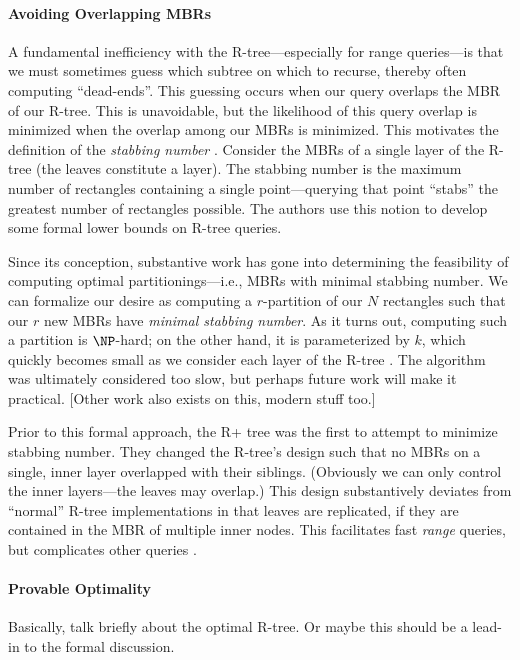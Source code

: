 \paragraph{Avoiding Overlapping MBRs}
A fundamental inefficiency with the R-tree---especially for range queries---is that we must sometimes guess which subtree on which to recurse, thereby often computing ``dead-ends''.
This guessing occurs when our query overlaps the MBR of our R-tree.
This is unavoidable, but the likelihood of this query overlap is minimized when the overlap among our MBRs is minimized.
This motivates the definition of the \emph{stabbing number} \cite{berggudmundssonhammarovermars00}.
Consider the MBRs of a single layer of the R-tree (the leaves constitute a layer).
The stabbing number is the maximum number of rectangles containing a single point---querying that point ``stabs'' the greatest number of rectangles possible.
The authors \cite{berggudmundssonhammarovermars00} use this notion to develop some formal lower bounds on R-tree queries.

Since its conception, substantive work has gone into determining the feasibility of computing optimal partitionings---i.e., MBRs with minimal stabbing number.
We can formalize our desire as computing a $r$-partition of our $N$ rectangles such that our $r$ new MBRs have \emph{minimal stabbing number}.
As it turns out, computing such a partition is $\NP$-hard; on the other hand, it is parameterized by $k$, which quickly becomes small as we consider each layer of the R-tree \cite{bergkhosraviverdonschotweele11}.
The algorithm was ultimately considered too slow, but perhaps future work will make it practical.
[Other work also exists on this, modern stuff too.]

Prior to this formal approach, the R+ tree \cite{sellisroussopoulosfaloutsos87} was the first to attempt to minimize stabbing number.
They changed the R-tree's design such that no MBRs on a single, inner layer overlapped with their siblings.
(Obviously we can only control the inner layers---the leaves may overlap.)
This design substantively deviates from ``normal'' R-tree implementations in that leaves are replicated, if they are contained in the MBR of multiple inner nodes.
This facilitates fast \emph{range} queries, but complicates other queries \cite{some paper talks about how it breaks down on perimiter queries or something---gaedegunther?samet?}.


\paragraph{Provable Optimality}
Basically, talk briefly about the optimal R-tree.
Or maybe this should be a lead-in to the formal discussion.
